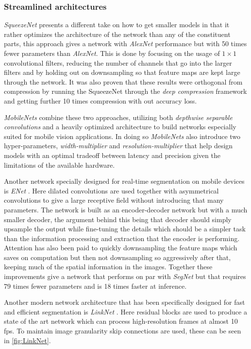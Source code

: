 \documentclass{kththesis}
\newcommand{\bibentry}[1]{\parencite{#1}}
\begin{document}
\subsubsection{Streamlined architectures}
\emph{SqueezeNet} \bibentry{iandola2016squeezenet} presents a different take on
how to get smaller models in that it rather optimizes the architecture of the
network than any of the constituent parts, this approach gives a network with
\emph{AlexNet} performance but with 50 times fewer parameters than 
\emph{AlexNet}. This is done by focusing on the usage of \(1 \times 1\)
convolutional filters, reducing the number of channels that go into the larger
filters and by holding out on downsampling so that feature maps are kept large
through the network. It was also proven that these results were orthogonal from
compression by running the SqueezeNet through the \emph{deep compression}
framework \bibentry{han2015deep} and getting further 10 times compression with
out accuracy loss. 

\emph{MobileNets} \bibentry{howard2017mobilenets} combine these two approaches,
utilizing both \emph{depthwise separable convolutions} and a heavily optimized
architecture to build networks especially suited for mobile vision applications.
In doing so \emph{MobileNets} also introduce two hyper-parameters,
\emph{width-multiplier} and \emph{resolution-multiplier} that help design models
with an optimal tradeoff between latency and precision given the limitations of
the available hardware. 

Another network specially designed for real-time segmentation on mobile devices
is \emph{ENet} \bibentry{paszke2016enet}. Here dilated convolutions are used
together with asymmetrical convolutions to give a large receptive field without
introducing that many parameters. The network is built as an encoder-decoder
network but with a much smaller decoder, the argument behind this being that
decoder should simply upsample the output while fine-tuning the details which
should be a simpler task than the information processing and extraction that the
encoder is performing. Attention has also been paid to quickly downsampling the
feature maps which saves on computation but then not downsampling so
aggressively after that, keeping much of the spatial information in the images.
Together these improvements give a network that performs on par with
\emph{SegNet} but that requires 79 times fewer parameters and is 18 times faster
at inference. 

Another modern network architecture that has been specifically designed for fast and
efficient segmentation is \textit{LinkNet}
\parencite{chaurasia2017linknet}. Here residual blocks \parencite{residual} are used to produce a
state of the art network which can process high-resolution frames at almost 10
fps. To maintain image granularity skip connections are used, these can be seen
in \cref{fig:LinkNet}.
\end{document}
